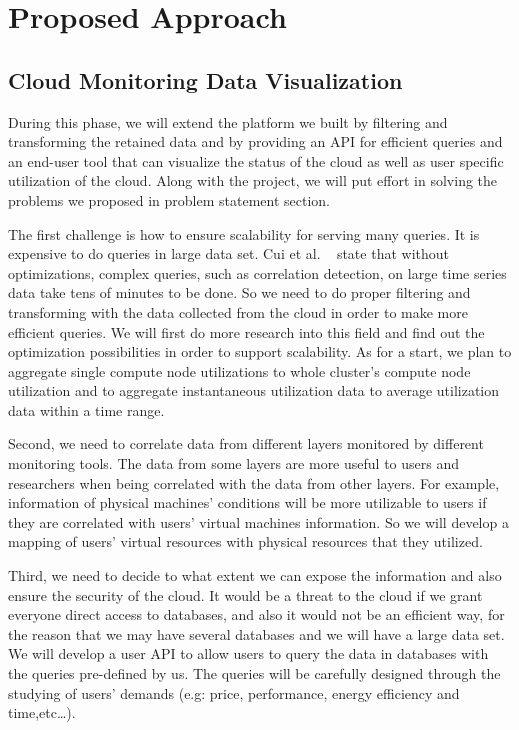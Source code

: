 \section{Proposed Approach}
\label{sec:ProposedApproach}



\subsection{Cloud Monitoring Data Visualization}
  
During this phase, we will extend the platform we built by filtering and transforming the retained data and by providing an API  for efficient queries and an end-user tool that can visualize the status of the cloud as well as user specific utilization of the cloud. Along with the project, we will put effort in solving the problems we proposed in problem statement section. 

The first challenge is how to ensure scalability for serving many queries. It is expensive to do queries in large data set. Cui et al. ~\cite{cuiusing} state that without optimizations, complex queries, such as correlation detection, on large time series data take tens of minutes to be done. So we need to do proper filtering and transforming with the data collected from the cloud in order to make more efficient queries. We will first do more research into this field and find out the optimization possibilities in order to support scalability. As for a start, we plan to aggregate single compute node utilizations to whole cluster’s compute node utilization and to aggregate  instantaneous utilization data to average utilization data within a time range. 

Second, we need to correlate data from different layers monitored by different monitoring tools. The data from some layers are more useful to users and researchers when being correlated with the data from other layers. For example, information of physical machines’ conditions will be more utilizable to users if they are correlated with users’ virtual machines information. So we will develop a mapping of users’ virtual resources with physical resources that they utilized. 

Third, we need to decide to what extent we can expose the information and also ensure the security of the cloud. It would be a threat to the cloud if we grant everyone direct access to databases, and also it would not be an efficient way, for the reason that we may have several databases and we will have a large data set. We will develop a user API to allow users to query the data in databases with the queries pre-defined by us. The queries will be carefully designed through the studying of users’ demands (e.g: price, performance, energy efficiency and time,etc…).


